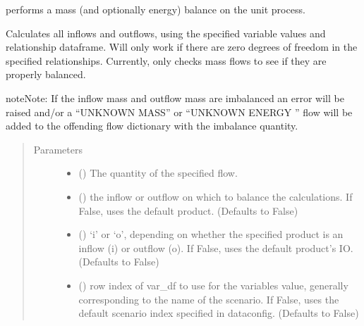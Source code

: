 \documentclass[a4paper,10pt,english]{sphinxmanual}
\begin{document}
\begin{fulllineitems}
\label{\detokenize{unit:unitprocess.UnitProcess.balance}}
performs a mass (and optionally energy) balance on the unit process.

Calculates all inflows and outflows, using the specified variable values
and relationship dataframe. Will only work if there are zero degrees of
freedom in the specified relationships. Currently, only checks mass
flows to see if they are properly balanced.

\begin{sphinxadmonition}{note}{Note:}
If the inflow mass and outflow mass are imbalanced an error will
be raised and/or a “UNKNOWN MASS” or  “UNKNOWN ENERGY ” flow will
be added to the offending flow dictionary with the imbalance quantity.
\end{sphinxadmonition}
\begin{quote}\begin{description}
\item[{Parameters}] \leavevmode\begin{itemize}
\item {} 
 () \textendash{} The quantity of the specified flow.

\item {} 
 () \textendash{} the inflow or outflow on which to balance
the calculations. If False, uses the default product.
(Defaults to False)

\item {} 
 () \textendash{} ‘i’ or ‘o’, depending on whether the specified
product is an inflow (i) or outflow (o). If False, uses the
default product’s IO.
(Defaults to False)

\item {} 
 () \textendash{} row index of var\_df to use for the variables value,
generally corresponding to the name of the scenario. If
False, uses the default scenario index specified in
dataconfig.
(Defaults to False)


\end{itemize}
\end{description}
\end{quote}
\end{fulllineitems}
\end{document}

